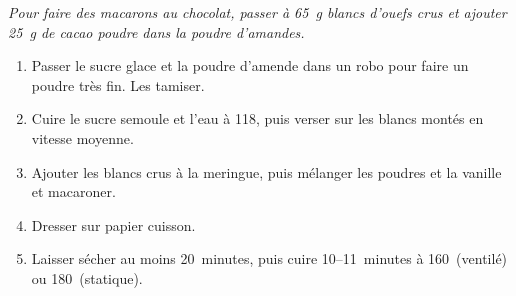 


\begin{ingredients}
\end{ingredients}

{\it Pour faire des macarons au chocolat, passer \`a 65~g blancs
  d'ouefs crus et ajouter 25~g de cacao poudre dans la poudre
  d'amandes.}

\begin{recipe}
  \begin{enumerate}

  \item Passer le sucre glace et la poudre d'amende dans un robo pour
    faire un poudre tr\`es fin.  Les tamiser.

  \item Cuire le sucre semoule et l'eau \`a 118\C, puis verser sur les
    blancs mont\'es en vitesse moyenne.

  \item Ajouter les blancs crus \`a la meringue, puis m\'elanger les
    poudres et la vanille et macaroner.

  \item Dresser sur papier cuisson.

  \item Laisser s\'echer au moins 20~minutes, puis cuire
    10--11~minutes \`a 160\C\ (ventil\'e) ou 180\C\ (statique).
  \end{enumerate}
\end{recipe}



\begin{ingredients}
\end{ingredients}



